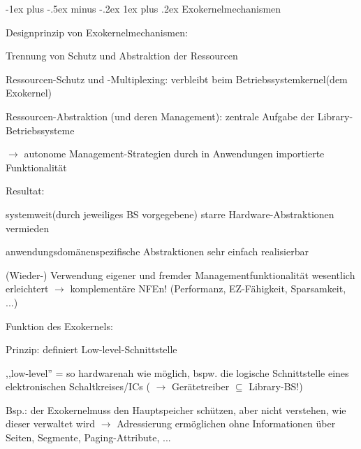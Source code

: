 \documentclass[a4paper]{article}
\makeatletter
\renewcommand{\subsubsection}{\@startsection{subsubsection}{3}{0mm}%
 {-1ex plus -.5ex minus -.2ex}%
 {1ex plus .2ex}%
 {\normalfont\small\bfseries}}
\makeatother
\begin{document}
\begin{multicols}{3}
    \subsubsection{Exokernelmechanismen}

    \begin{itemize*}
        \item
        Designprinzip von Exokernelmechanismen:
        \begin{itemize*}
            \item Trennung von Schutz und Abstraktion der Ressourcen
            \item Ressourcen-Schutz und -Multiplexing: verbleibt beim Betriebssystemkernel(dem Exokernel)
            \item Ressourcen-Abstraktion (und deren Management): zentrale Aufgabe der Library-Betriebssysteme \begin{itemize*} \item[$\rightarrow$] autonome Management-Strategien durch in Anwendungen importierte Funktionalität \end{itemize*}
            \item Resultat: \begin{enumerate*} \item systemweit(durch jeweiliges BS vorgegebene) starre Hardware-Abstraktionen vermieden \item anwendungsdomänenspezifische Abstraktionen sehr einfach realisierbar \item (Wieder-) Verwendung eigener und fremder Managementfunktionalität wesentlich erleichtert $\rightarrow$ komplementäre NFEn! (Performanz, EZ-Fähigkeit, Sparsamkeit, ...) \end{enumerate*}
        \end{itemize*}
        \item
        Funktion des Exokernels:
        \begin{itemize*}
            \item Prinzip: definiert Low-level-Schnittstelle \begin{itemize*} \item ,,low-level'' = so hardwarenah wie möglich, bspw. die logische Schnittstelle eines elektronischen Schaltkreises/ICs ( $\rightarrow$ Gerätetreiber $\subseteq$ Library-BS!) \item Bsp.: der Exokernelmuss den Hauptspeicher schützen, aber nicht verstehen, wie dieser verwaltet wird $\rightarrow$ Adressierung ermöglichen ohne Informationen über Seiten, Segmente, Paging-Attribute, ... \end{itemize*}

\end{itemize*}
\end{itemize*}
\end{multicols}
\end{document}
